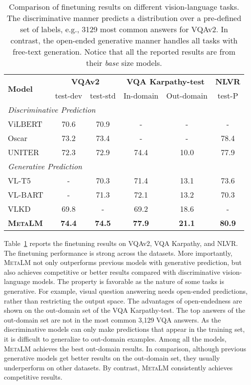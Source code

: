 \documentclass{article}
\theoremstyle{plain}
\theoremstyle{definition}
\theoremstyle{remark}
\newcommand\ours{\textsc{MetaLM}}
\begin{document}
\begin{table}[t]
\centering
\begin{tabular}{@{}lccccc@{}}
\toprule
\multirow{2}{*}{\textbf{Model}} & \multicolumn{2}{c}{\textbf{VQAv2}} & \multicolumn{2}{c}{\textbf{VQA Karpathy-test}} & \textbf{NLVR} \\ \cmidrule(l){2-6} 
& test-dev & test-std & In-domain & Out-domain & test-P \\
\midrule
\multicolumn{6}{l}{\textit{Discriminative Prediction}} \\
ViLBERT~\citep{lu2019vilbert} & 70.6 & 70.9 & - & - & - \\
Oscar~\citep{li2020oscar} & 73.2 & 73.4 & - & - & 78.4 \\
UNITER~\citep{chen2020uniter} & 72.3 & 72.9 & 74.4 & 10.0 & 77.9 \\
\midrule
\multicolumn{6}{l}{\textit{Generative Prediction}} \\
VL-T5~\citep{cho2021unifying} & - & 70.3 & 71.4 & 13.1 & 73.6 \\
VL-BART~\citep{cho2021unifying} & - & 71.3 & 72.1 & 13.2 & 70.3 \\
VLKD~\citep{dai2021enabling} & 69.8 & - & 69.2 & 18.6 & - \\
\textbf{\ours{}} & \bf 74.4 & \bf 74.5 & \bf 77.9 & \bf 21.1 & \bf 80.9 \\
\bottomrule
\end{tabular}
\caption{Comparison of finetuning results on different vision-language tasks.
The discriminative manner predicts a distribution over a pre-defined set of labels, e.g., 3129 most common answers for VQAv2. In contrast, the open-ended generative manner handles all tasks with free-text generation.
Notice that all the reported results are from their \textit{base} size models.}
\label{tab:vl:ft:vqa-nlvr}
\end{table}


Table~\ref{tab:vl:ft:vqa-nlvr} reports the finetuning results on VQAv2, VQA Karpathy, and NLVR.
The finetuning performance is strong across the datasets.
More importantly, \ours{} not only outperforms previous models with generative prediction, but also achieves competitive or better results compared with discriminative vision-language models.
The property is favorable as the nature of some tasks is generative. For example, visual question answering needs open-ended predictions, rather than restricting the output space.
The advantages of open-endedness are shown on the out-domain set of the VQA Karpathy-test.
The top answers of the out-domain set are not in the most common 3,129 VQA answers.
As the discriminative models can only make predictions that appear in the training set, it is difficult to generalize to out-domain examples.
Among all the models, \ours{} achieves the best out-domain results.
In comparison, although previous generative models get better results on the out-domain set, they usually underperform on other datasets.
By contrast, \ours{} consistently achieves competitive results.
\end{document}

